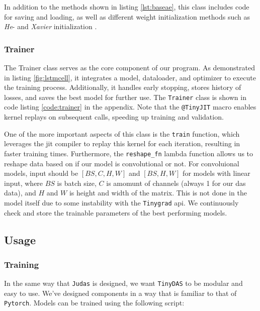 In addition to the methods shown in listing \ref{lst:baseae}, this class includes code for saving and loading, as well as different weight initialization methods such as \textit{He}- and \textit{Xavier} initialization \cite{kumar2017weight}.

\subsubsection{Trainer}

The Trainer class serves as the core component of our program. As demonstrated in listing \ref{fig:lstmcell}, it integrates a model, dataloader, and optimizer to execute the training process. Additionally, it handles early stopping, stores history of losses, and saves the best model for further use. The \texttt{Trainer} class is shown in code listing \ref{code:trainer} in the appendix. Note that the \texttt{@TinyJIT} macro enables kernel replays on subsequent calls, speeding up training and validation. 



One of the more important aspects of this class is the \texttt{train} function, which leverages the \acrshort{jit} compiler to replay this kernel for each iteration, resulting in faster training times. Furthermore, the \texttt{reshape\_fn} lambda function allows us to reshape data based on if our model is convolutional or not. For convoluional models, input should be $[BS, C, H, W]$ and $[BS, H, W]$ for models with linear input, where $BS$ is batch size, $C$ is amomunt of channels (always 1 for our \acrshort{das} data), and $H$ and $W$ is height and width of the matrix. This is not done in the model itself due to some instability with the \texttt{Tinygrad} \acrshort{api}. We continuously check and store the trainable parameters of the best performing models.


\subsection{Usage}

\subsubsection{Training}

In the same way that \texttt{Judas} is designed, we want \texttt{TinyDAS} to be modular and easy to use. We've designed components in a way that is familiar to that of \texttt{Pytorch}\cite{paszke2019pytorch}. Models can be trained using the following script:

